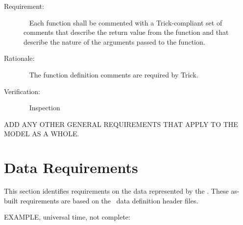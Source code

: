 \documentclass[twoside,11pt,titlepage]{report}
\begin{document}
\label{reqt:func_trick_comments}
\begin{description}
  \item[Requirement:]\ \newline
    Each function shall be commented with a Trick-compliant
    set of comments that describe the return value from the
    function and that describe the nature of the arguments
    passed to the function.

  \item[Rationale:]\ \newline
    The function definition comments are required by Trick.

  \item[Verification:]\ \newline
    Inspection
\end{description}


ADD ANY OTHER GENERAL REQUIREMENTS THAT APPLY TO THE
MODEL AS A WHOLE.


\section{Data Requirements}\label{sec:data_reqts}

This section identifies requirements on the data
represented by the \MODEL.  These as-built requirements are
based on the \MODEL\ data definition header files.

EXAMPLE, universal time, not complete:
\end{document}
